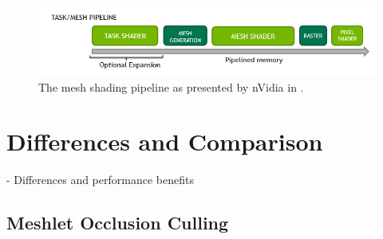 
\begin{figure}[h]
    \centering
    \includegraphics[width=\linewidth]{images/graphics/mesh-rendering-pipeline.png}
    \caption{The mesh shading pipeline as presented by nVidia in \cite[Christoph Kubisch]{Kubisch2018}.}
    \label{fig:mesh-rendering-pipeline}
\end{figure}





\section{Differences and Comparison} \label{sec-differences-and-comparison}

- Differences and performance benefits

\subsection{Meshlet Occlusion Culling} \label{subsec-meshlet-occ-culling}


